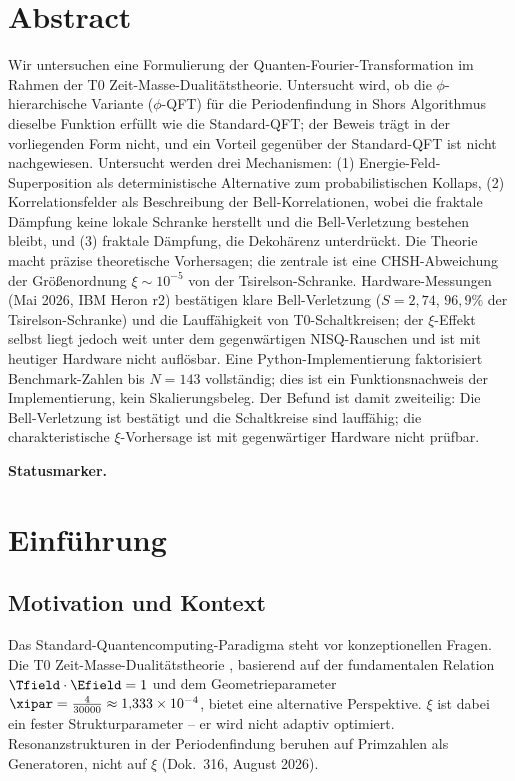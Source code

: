 \section*{Abstract}

Wir untersuchen eine Formulierung der Quanten-Fourier-Transformation im Rahmen der T0 Zeit-Masse-Dualitätstheorie. Untersucht wird, ob die $\phi$-hierarchische Variante ($\phi$-QFT) für die Periodenfindung in Shors Algorithmus dieselbe Funktion erfüllt wie die Standard-QFT; der Beweis trägt in der vorliegenden Form nicht, und ein Vorteil gegenüber der Standard-QFT ist nicht nachgewiesen. Untersucht werden drei Mechanismen: (1) Energie-Feld-Superposition als deterministische Alternative zum probabilistischen Kollaps, (2) Korrelationsfelder als Beschreibung der Bell-Korrelationen, wobei die fraktale Dämpfung keine lokale Schranke herstellt und die Bell-Verletzung bestehen bleibt, und (3) fraktale Dämpfung, die Dekohärenz unterdrückt. Die Theorie macht präzise theoretische Vorhersagen; die zentrale ist eine CHSH-Abweichung der Größenordnung $\xi \sim 10^{-5}$ von der Tsirelson-Schranke. Hardware-Messungen (Mai 2026, IBM Heron r2) bestätigen klare Bell-Verletzung ($S = 2{,}74$, $96{,}9\%$ der Tsirelson-Schranke) und die Lauffähigkeit von T0-Schaltkreisen; der $\xi$-Effekt selbst liegt jedoch weit unter dem gegenwärtigen NISQ-Rauschen und ist mit heutiger Hardware nicht auflösbar. Eine Python-Implementierung faktorisiert Benchmark-Zahlen bis $N = 143$ vollständig; dies ist ein Funktionsnachweis der Implementierung, kein Skalierungsbeleg. Der Befund ist damit zweiteilig: Die Bell-Verletzung ist bestätigt und die Schaltkreise sind lauffähig; die charakteristische $\xi$-Vorhersage ist mit gegenwärtiger Hardware nicht prüfbar.


\clearpage

\medskip\noindent\textbf{Statusmarker.}


\section{Einführung}

\subsection{Motivation und Kontext}

Das Standard-Quantencomputing-Paradigma steht vor konzeptionellen Fragen. Die T0 Zeit-Masse-Dualitätstheorie \cite{pascher_t0_2025}, basierend auf der fundamentalen Relation $\Tfield \cdot \Efield = 1$ und dem Geometrieparameter $\xipar = \frac{4}{30000} \approx 1{,}333 \times 10^{-4}$, bietet eine alternative Perspektive. $\xi$ ist dabei ein fester Strukturparameter -- er wird nicht adaptiv optimiert. Resonanzstrukturen in der Periodenfindung beruhen auf Primzahlen als Generatoren, nicht auf $\xi$ (Dok.~316, August 2026).

